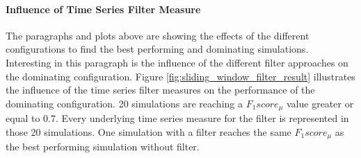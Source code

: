 \paragraph{Influence of Time Series Filter Measure} The paragraphs and plots above are showing the effects of the
different configurations to find the best performing and dominating simulations. Interesting in this paragraph is the
influence of the different filter approaches on the dominating configuration. Figure
\ref{fig:sliding_window_filter_result} illustrates the influence of the time series filter measures on the performance
of the dominating configuration. 20 simulations are reaching a $F_{1}score_{\mu}$ value greater or equal to 0.7. Every
underlying time series measure for the filter is represented in those 20 simulations. One simulation with a filter
reaches the same $F_{1}score_{\mu}$ as the best performing simulation without filter.

